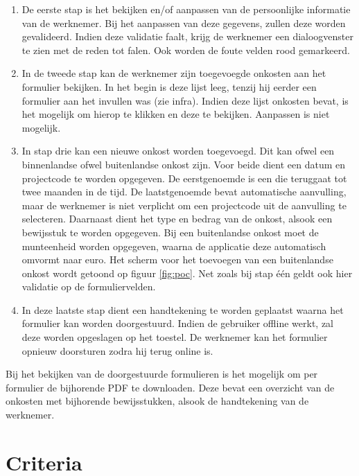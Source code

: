 \begin{enumerate}
\item De eerste stap is het bekijken en/of aanpassen van de persoonlijke informatie van de werknemer.
Bij het aanpassen van deze gegevens, zullen deze worden gevalideerd.
Indien deze validatie faalt, krijg de werknemer een dialoogvenster te zien met de reden tot falen.
Ook worden de foute velden rood gemarkeerd.

\item In de tweede stap kan de werknemer zijn toegevoegde onkosten aan het formulier bekijken.
In het begin is deze lijst leeg, tenzij hij eerder een formulier aan het invullen was (zie infra).
Indien deze lijst onkosten bevat, is het mogelijk om hierop te klikken en deze te bekijken.
Aanpassen is niet mogelijk.

\item In stap drie kan een nieuwe onkost worden toegevoegd.
Dit kan ofwel een binnenlandse ofwel buitenlandse onkost zijn.
Voor beide dient een datum en projectcode te worden opgegeven.
De eerstgenoemde is een  die teruggaat tot twee maanden in de tijd.
De laatstgenoemde bevat automatische aanvulling, maar de werknemer is niet verplicht om een projectcode uit de aanvulling te selecteren.
Daarnaast dient het type en bedrag van de onkost, alsook een bewijsstuk te worden opgegeven.
Bij een buitenlandse onkost moet de munteenheid worden opgegeven, waarna de applicatie deze automatisch omvormt naar euro.
Het scherm voor het toevoegen van een buitenlandse onkost wordt getoond op figuur \ref{fig:poc}. 
Net zoals bij stap één geldt ook hier validatie op de formuliervelden.

\item In deze laatste stap dient een handtekening te worden geplaatst waarna het formulier kan worden doorgestuurd.
Indien de gebruiker offline werkt, zal deze worden opgeslagen op het toestel.
De werknemer kan het formulier opnieuw doorsturen zodra hij terug online is.

\end{enumerate}

Bij het bekijken van de doorgestuurde formulieren is het mogelijk om per formulier de bijhorende PDF te downloaden. 
Deze bevat een overzicht van de onkosten met bijhorende bewijsstukken, alsook de handtekening van de werknemer.

\section{Criteria}
\label{sec:vergelijking-criteria}

